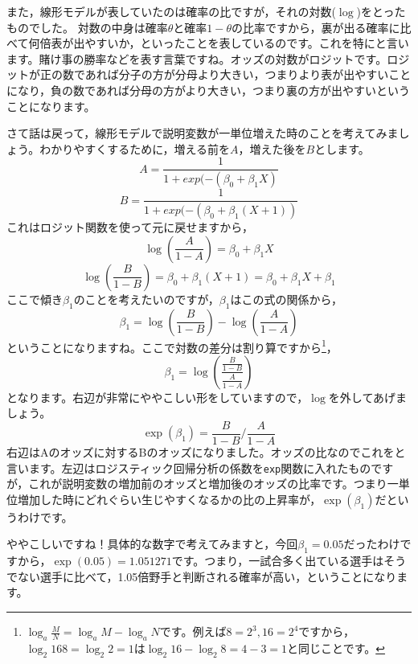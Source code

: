 \documentclass{ltjsbook}
\begin{document}
また，線形モデルが表していたのは確率の比ですが，それの対数($\log$)をとったものでした。
対数の中身は確率$\theta$と確率$1-\theta$の比率ですから，裏が出る確率に比べて何倍表が出やすいか，といったことを表しているのです。これを特にと言います。賭け事の勝率などを表す言葉ですね。オッズの対数がロジットです。ロジットが正の数であれば分子の方が分母より大きい，つまりより表が出やすいことになり，負の数であれば分母の方がより大きい，つまり裏の方が出やすいということになります。

さて話は戻って，線形モデルで説明変数が一単位増えた時のことを考えてみましょう。わかりやすくするために，増える前を$A$，増えた後を$B$とします。
\[ A = \frac{1}{1+exp(-(\beta_0 + \beta_1X)} \]
\[ B = \frac{1}{1+exp(-(\beta_0 + \beta_1(X+1))} \]
これはロジット関数を使って元に戻せますから，
\[ \log\left( \frac{A}{1-A} \right) = \beta_0 + \beta_1 X \]
\[ \log\left(\frac{B}{1-B} \right)= \beta_0 + \beta_1 (X+1)  = \beta_0 + \beta_1X + \beta_1\]
ここで傾き$\beta_1$のことを考えたいのですが，$\beta_1$はこの式の関係から，
\[ \beta_1 = \log\left(\frac{B}{1-B} \right) - \log\left( \frac{A}{1-A} \right) \]
ということになりますね。ここで対数の差分は割り算ですから\footnote{$\log_a \frac{M}{N} = \log_a M-\log_a N$です。例えば$8=2^3,16=2^4$ですから，$\log_2{16}{8} = \log_2 2 = 1$は$\log_2 16 - \log_2 8 = 4 - 3 = 1$と同じことです。}，
\[ \beta_1 = \log\left( \frac{ \frac{B}{1-B} }{ \frac{A}{1-A} } \right) \]
となります。右辺が非常にややこしい形をしていますので，$\log$を外してあげましょう。
\[ \exp(\beta_1) =  \frac{B}{1-B}  \Big/  \frac{A}{1-A}  \]
右辺はAのオッズに対するBのオッズになりました。オッズの比なのでこれをと言います。左辺はロジスティック回帰分析の係数を\verb|exp|関数に入れたものですが，これが説明変数の増加前のオッズと増加後のオッズの比率です。つまり一単位増加した時にどれぐらい生じやすくなるかの比の上昇率が，$\exp(\beta_1)$だというわけです。

ややこしいですね！具体的な数字で考えてみますと，今回$\beta_1=0.05$だったわけですから，$\exp(0.05)=1.051271$です。つまり，一試合多く出ている選手はそうでない選手に比べて，1.05倍野手と判断される確率が高い，ということになります。
\end{document}
